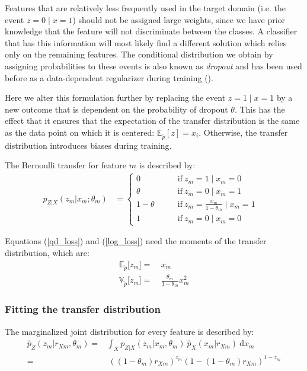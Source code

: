 \documentclass[twoside,11pt]{article}
\begin{document}
Features that are relatively less frequently used in the target domain (i.e. the event $z=0 \mid x=1$) should not be assigned large weights, since we have prior knowledge that the feature will not discriminate between the classes. A classifier that has this information will most likely find a different solution which relies only on the remaining features. The conditional distribution we obtain by assigning probabilities to these events is also known as \emph{dropout} and has been used before as a data-dependent regularizer during training (\citealp{wager2013dropout, rostamizadeh2011learning}). 

Here we alter this formulation further by replacing the event $z=1 \mid x=1$ by a new outcome that is dependent on the probability of dropout $\theta$. This has the effect that it ensures that the expectation of the transfer distribution is the same as the data point on which it is centered: $\mathbb{E}_{\tilde{p}}[z] = x_{i}$. Otherwise, the transfer distribution introduces biases during training.

The Bernoulli transfer for feature $m$ is described by:
\begin{align}
p_{Z|X}(z_m|x_m;\theta_m) &= \begin{cases}
0 \quad & \text{if} \ z_m=1 \mid x_m=0\\
\theta \quad & \text{if} \ z_m=0 \mid x_m=1\\
1-\theta \quad \quad  &\text{if} \ z_m=\frac{x_m}{1-\theta_m} \mid x_m=1\\
1 \quad & \text{if} \ z_m=0 \mid x_m=0
\end{cases} &
\end{align}

Equations (\ref{qd_loss}) and (\ref{log_loss}) need the moments of the transfer distribution, which are:
\begin{align}
\mathbb{E}_{\tilde{p}}\big[z_m \big] =& \ x_m \label{Eblank} \\
\mathbb{V}_{\tilde{p}}\big[z_m \big] =& \ \frac{\theta_m}{1-\theta_m} x_m^{2} \label{Vblank}
\end{align}

\subsubsection{Fitting the transfer distribution}
The marginalized joint distribution for every feature is described by:
\begin{align}
	\hat{p}_{Z}(z_{m}|r_{Xm}, \theta_{m}) =& \int_{X} p_{Z|X}(z_m|x_m, \theta_m) \ \hat{p}_{X}(x_m|r_{Xm}) \ \mathrm{d}x_m \nonumber \\
	=& \ ((1-\theta_m)r_{Xm})^{z_m}(1-(1-\theta_m)r_{Xm})^{1-z_m}
\end{align}
\end{document}
